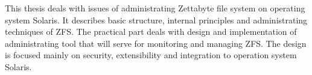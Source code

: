 This thesis deals with issues of administrating Zettabyte file system on operating system Solaris. It describes basic structure, internal principles and administrating techniques of ZFS. The practical part deals with design and implementation of administrating tool that will serve for monitoring and managing ZFS. The design is focused mainly on security, extensibility and integration to operation system Solaris. 